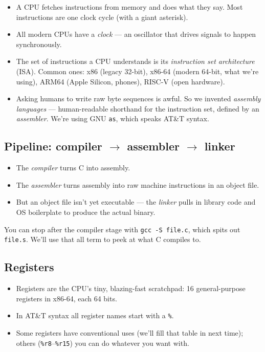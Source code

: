 \documentclass[11pt]{article}
\begin{document}
\begin{itemize}
  \item A CPU fetches instructions from memory and does what they
    say. Most instructions are one clock cycle (with a giant
    asterisk).
  \item All modern CPUs have a \emph{clock} --- an oscillator that
    drives signals to happen synchronously.
  \item The set of instructions a CPU understands is its
    \emph{instruction set architecture} (ISA). Common ones:
    x86 (legacy 32-bit), x86-64 (modern 64-bit, what we're using),
    ARM64 (Apple Silicon, phones), RISC-V (open hardware).
  \item Asking humans to write raw byte sequences is awful. So we
    invented \emph{assembly languages} --- human-readable shorthand
    for the instruction set, defined by an \emph{assembler}. We're
    using GNU \texttt{as}, which speaks AT\&T syntax.
\end{itemize}

\subsection*{Pipeline: compiler $\to$ assembler $\to$ linker}

\begin{itemize}
  \item The \emph{compiler} turns C into assembly.
  \item The \emph{assembler} turns assembly into raw machine
    instructions in an object file.
  \item But an object file isn't yet executable --- the \emph{linker}
    pulls in library code and OS boilerplate to produce the actual
    binary.
\end{itemize}

You can stop after the compiler stage with \texttt{gcc -S file.c},
which spits out \texttt{file.s}. We'll use that all term to peek
at what C compiles to.

\subsection*{Registers}

\begin{itemize}
  \item Registers are the CPU's tiny, blazing-fast scratchpad:
    16 general-purpose registers in x86-64, each 64 bits.
  \item In AT\&T syntax all register names start with a \texttt{\%}.
  \item Some registers have conventional uses (we'll fill that table
    in next time); others (\texttt{\%r8}--\texttt{\%r15}) you can
    do whatever you want with.
\end{itemize}
\end{document}
